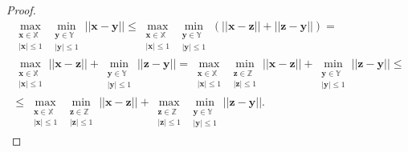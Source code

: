 \begin{proof} 
\begin{equation}
\label{eq:l2:2}
\begin{aligned}
\max_{\substack{\textbf{x} \in \mathbb{X} \\ \left|\textbf{x}\right|\leq 1}}\min_{\substack{\textbf{y} \in \mathbb{Y} \\ \left|\textbf{y}\right|\leq 1}}||\textbf{x}-\textbf{y}||\leq
\max_{\substack{\textbf{x} \in \mathbb{X} \\ \left|\textbf{x}\right|\leq 1}}\min_{\substack{\textbf{y} \in \mathbb{Y} \\ \left|\textbf{y}\right|\leq 1}}\left(||\textbf{x}-\textbf{z}|| + ||\textbf{z} - \textbf{y}||\right) = \\
\max_{\substack{\textbf{x} \in \mathbb{X} \\ \left|\textbf{x}\right|\leq 1}}||\textbf{x}-\textbf{z}|| + \min_{\substack{\textbf{y} \in \mathbb{Y} \\ \left|\textbf{y}\right|\leq 1}}||\textbf{z} - \textbf{y}|| = \max_{\substack{\textbf{x} \in \mathbb{X} \\ \left|\textbf{x}\right|\leq 1}}\min_{\substack{\textbf{z} \in \mathbb{Z} \\ \left|\textbf{z}\right|\leq 1}}||\textbf{x}-\textbf{z}|| + \min_{\substack{\textbf{y} \in \mathbb{Y} \\ \left|\textbf{y}\right|\leq 1}}||\textbf{z} - \textbf{y}|| \leq \\
\leq \max_{\substack{\textbf{x} \in \mathbb{X} \\ \left|\textbf{x}\right|\leq 1}}\min_{\substack{\textbf{z} \in \mathbb{Z} \\ \left|\textbf{z}\right|\leq 1}}||\textbf{x}-\textbf{z}|| + 
\max_{\substack{\textbf{z} \in \mathbb{Z} \\ \left|\textbf{z}\right|\leq 1}}\min_{\substack{\textbf{y} \in \mathbb{Y} \\ \left|\textbf{y}\right|\leq 1}}||\textbf{z}-\textbf{y}||.
\end{aligned}
\end{equation}
\end{proof}